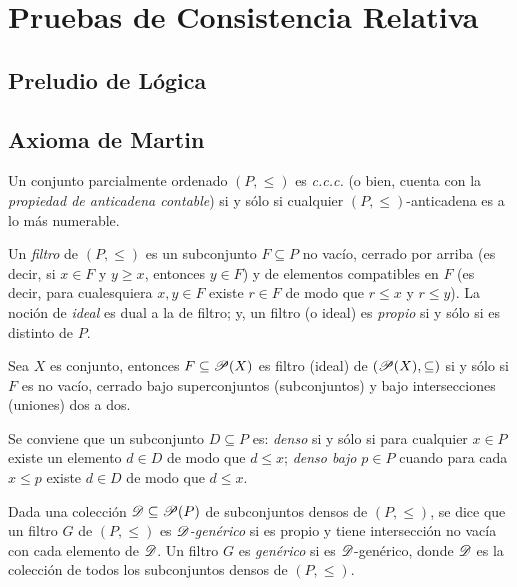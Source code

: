 \newpage
\section{Pruebas de Consistencia Relativa}
\subsection{Preludio de Lógica}
\subsection{Axioma de Martin}

Un conjunto parcialmente ordenado $(P,\leq)$ es \textit{c.c.c.} (o bien, cuenta con la \textit{propiedad de anticadena contable}) si y sólo si cualquier $(P,\leq)$-anticadena es a lo más numerable.

Un \textit{filtro} de $(P,\leq)$ es un subconjunto $F \subseteq P$ no vacío, cerrado por arriba (es decir, si $x \in F$ y $y \geq x$, entonces $y \in F$) y de elementos compatibles en $F$ (es decir, para cualesquiera $x,y \in F$ existe $r \in F$ de modo que $r \leq x$ y $r \leq y$). La noción de \textit{ideal} es dual a la de filtro; y, un filtro (o ideal) es \textit{propio} si y sólo si es distinto de $P$.

\begin{observacion}\label{obs-filtr-potencia}
	Sea $X$ es conjunto, entonces $F \subseteq \mathscr{P}(X)$ es filtro (ideal) de $(\mathscr{P}(X),\subseteq)$ si y sólo si $F$ es no vacío, cerrado bajo superconjuntos (subconjuntos) y bajo intersecciones (uniones) dos a dos.
\end{observacion}

Se conviene que un subconjunto $D \subseteq P$ es: \textit{denso} si y sólo si para cualquier $x \in P$ existe un elemento $d \in D$ de modo que $d \leq x$; \textit{denso bajo $p \in P$} cuando para cada $x \leq p$ existe $d \in D$ de modo que $d \leq x$.

Dada una colección $\mathscr{D} \subseteq \mathscr{P}(P)$ de subconjuntos densos de $(P,\leq)$, se dice que un filtro $G$ de $(P,\leq)$ es \textit{$\mathscr{D}$-genérico} si es propio y tiene intersección no vacía con cada elemento de $\mathscr{D}$. Un filtro $G$ es \textit{genérico} si es $\mathscr{D}$-genérico, donde $\mathscr{D}$ es la colección de todos los subconjuntos densos de $(P,\leq)$.

